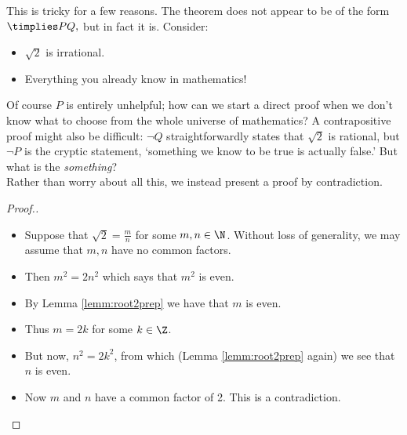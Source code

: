 \noindent This is tricky for a few reasons. The theorem does not appear to be of the form $\timplies P{Q,}$ but in fact it is. Consider:
\begin{itemize}\setlength{\itemsep}{0pt}
  \item[] $\sqrt 2$ is irrational.
  \item[] Everything you already know in mathematics!
\end{itemize}
Of course $P$ is entirely unhelpful; how can we start a direct proof when we don't know what to choose from the whole universe of mathematics? A contrapositive proof might also be difficult: $\neg Q$ straightforwardly states that $\sqrt 2$ is rational, but $\neg P$ is the cryptic statement, `something we know to be true is actually false.' But what is the \emph{something}?\\
Rather than worry about all this, we instead present a proof by contradiction.

\begin{proof}[Proof.\hspace{-27pt}]
\begin{itemize}\setlength{\itemsep}{-2pt}
  \item[] Suppose that $\sqrt 2=\frac mn$ for some $m,n\in\N$. Without loss of generality, we may assume that $m,n$ have no common factors.
  \item[] Then $m^2=2n^2$ which says that $m^2$ is even.
  \item[] By Lemma \ref{lemm:root2prep} we have that $m$ is even.
  \item[] Thus $m=2k$ for some $k\in\Z$.
	\item[] But now, $n^2=2k^2$, from which (Lemma \ref{lemm:root2prep} again) we see that $n$ is even.
	\item[] Now $m$ and $n$ have a common factor of 2. This is a contradiction.\qedhere
\end{itemize}
\end{proof}


